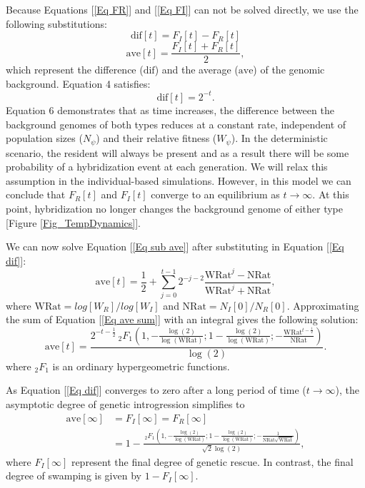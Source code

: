 \documentclass[a4paper,10pt]{article}
\begin{document}
	Because Equations [\ref{Eq FR}] and [\ref{Eq FI}] can not be solved directly, we use the following substitutions:
	\begin{equation}
	\text{dif}[t] = F_I[t] - F_R[t]
	\label{Eq sub dif}
	\end{equation}
	\begin{equation}
	\text{ave}[t] = \frac{F_I[t] + F_R[t]}{2},
	\label{Eq sub ave}
	\end{equation}
	which represent the difference ($\text{dif}$) and the average ($\text{ave}$) of the genomic background. Equation 4 satisfies:
	\begin{equation}
	\text{dif}[t] = 2^{-t}.
	\label{Eq dif}
	\end{equation}
	Equation 6 demonstrates that as time increases, the difference between the background genomes of both types reduces at a constant rate, independent of population sizes ($N_\psi$) and their relative fitness ($W_\psi$). In the deterministic scenario, the resident will always be present and as a result there will be some probability of a hybridization event at each generation. We will relax this assumption in the individual-based simulations. However, in this model we can conclude that $F_R[t]$ and $F_I[t]$ converge to an equilibrium as $t\to\infty$. At this point, hybridization no longer changes the background genome of either type [Figure \ref{Fig_TempDynamics}].
	
	We can now solve Equation [\ref{Eq sub ave}] after substituting in Equation [\ref{Eq dif}]:
	\begin{equation}
	\text{ave}[t] = \frac{1}{2} + \sum _{j=0}^{t-1} 2^{-j-2} \frac{\text{WRat}^j-\text{NRat} }{\text{WRat}^j+\text{NRat}},
	\label{Eq ave sum}
	\end{equation}
	where $\text{WRat} = log[W_R] / log[W_I]$ and $\text{NRat} = N_I[0] / N_R[0]$. Approximating the sum of Equation [\ref{Eq ave sum}] with an integral gives the following solution:
	\begin{equation}
	\text{ave}[t] = \frac{2^{-t-\frac{1}{2}} \, _2F_1\left(1,-\frac{\log (2)}{\log (\text{WRat})};1-\frac{\log (2)}{\log (\text{WRat})};-\frac{\text{WRat}^{t-\frac{1}{2}}}{\text{NRat}}\right)}{\log (2)}.
	\label{Eq ave integral}
	\end{equation}
	where $_2F_1$ is an ordinary hypergeometric functions.
	
	As Equation [\ref{Eq dif}] converges to zero after a long period of time ($t\to\infty$), the asymptotic degree of genetic introgression simplifies to
	\begin{equation}
	\begin{split}
	\text{ave}[\infty] & = F_I[\infty] = F_R[\infty] \\
	& = 1-\frac{\, _2F_1\left(1,-\frac{\log (2)}{\log (\text{WRat})};1-\frac{\log (2)}{\log (\text{WRat})};-\frac{1}{\text{NRat} \sqrt{\text{WRat}}}\right)}{\sqrt{2} \log (2)},
	\end{split}
	\label{Eq Asymptotic}
	\end{equation}
	where $F_I[\infty]$ represent the final degree of genetic rescue. In contrast, the final degree of swamping is given by $1-F_I[\infty]$.
	
\end{document}
